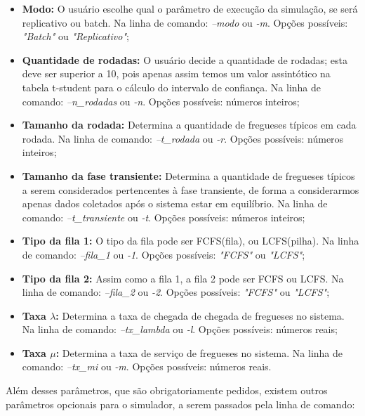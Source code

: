 \documentclass[a4paper,10pt]{article}
\begin{document}
\begin {itemize}
\item \textbf{Modo:} O usuário escolhe qual o parâmetro de execução da simulação, se será replicativo ou batch. Na linha de comando: \emph{--modo} ou \emph{-m}. Opções possíveis: \emph{"Batch"} ou \emph{"Replicativo"};

\item \textbf{Quantidade de rodadas:} O usuário decide a quantidade de rodadas; esta deve ser superior a 10, pois apenas assim temos um valor assintótico na tabela t-student para o cálculo do intervalo de confiança. Na linha de comando: \emph{--n\_rodadas} ou \emph{-n}. Opções possíveis: números inteiros;

\item \textbf{Tamanho da rodada:} Determina a quantidade de fregueses típicos em cada rodada. Na linha de comando: \emph{--t\_rodada} ou \emph{-r}. Opções possíveis: números inteiros;

\item \textbf{Tamanho da fase transiente:} Determina a quantidade de fregueses típicos a serem considerados pertencentes à fase transiente, de forma a considerarmos apenas dados coletados após o sistema estar em equilíbrio. Na linha de comando: \emph{--t\_transiente} ou \emph{-t}. Opções possíveis: números inteiros;

\item \textbf{Tipo da fila 1:} O tipo da fila pode ser FCFS(fila), ou LCFS(pilha). Na linha de comando: \emph{--fila\_1} ou \emph{-1}. Opções possíveis: \emph{"FCFS"} ou \emph{"LCFS"};

\item \textbf{Tipo da fila 2:} Assim como a fila 1, a fila 2 pode ser FCFS ou LCFS. Na linha de comando: \emph{--fila\_2} ou \emph{-2}. Opções possíveis: \emph{"FCFS"} ou \emph{"LCFS"};

\item \textbf{Taxa $\lambda$:} Determina a taxa de chegada de chegada de fregueses no sistema. Na linha de comando: \emph{--tx\_lambda} ou \emph{-l}. Opções possíveis: números reais;

\item \textbf{Taxa $\mu$:} Determina a taxa de serviço de fregueses no sistema. Na linha de comando: \emph{--tx\_mi} ou \emph{-m}. Opções possíveis: números reais.
\end {itemize}

    Além desses parâmetros, que são obrigatoriamente pedidos, existem outros parâmetros opcionais para o simulador, a serem passados pela linha de comando:
\end{document}
